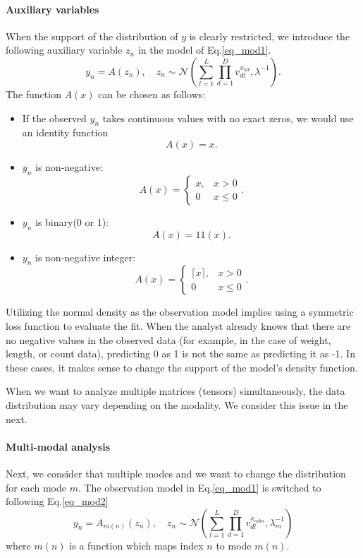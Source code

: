 \documentclass[a4paper,12ptc]{jsarticle} %
\newcommand{\one}{1\!\!1}
\begin{document}
\paragraph{Auxiliary variables}
When the support of the distribution of $y$ is clearly restricted, we introduce the following auxiliary variable $z_n$ in the model of Eq.\ref{eq_mod1}.
\begin{equation}
    y_n = A(z_n), \quad z_n \sim \mathcal{N}\left(\sum_{l=1}^L \prod_{d=1}^Dv_{dl}^{x_{nd}}, \lambda^{-1}\right).
\end{equation}
The function $A(x)$  can be chosen as follows:
\begin{itemize}
\item If the observed $y_n$ takes continuous values with no exact zeros, we would use an identity function 
$$
A(x)=x.
$$
    \item 
$y_n$ is non-negative:
$$
A(x)=\begin{cases}x, &x>0\\0 &x\leq 0\end{cases}.
$$
\item
$y_n$ is binary(0 or 1):
$$
A(x)=\one(x).
$$
\item
$y_n$ is non-negative integer:
$$
A(x)=\begin{cases}\lceil x\rceil, & x>0\\0 &x\leq 0\end{cases}.
$$
\end{itemize}
Utilizing the normal density as the observation model implies using a symmetric loss function to evaluate the fit.
When the analyst already knows that there are no negative values in the observed data (for example, in the case of weight, length, or count data), predicting 0 as 1 is not the same as predicting it as -1.
In these cases, it makes sense to change the support of the model's density function.

When we want to analyze multiple matrices (tensors) simultaneously, the data distribution may vary depending on the modality. 
We consider this issue in the next.

\paragraph{Multi-modal analysis} Next, we consider that multiple modes and we want to change the distribution for each mode $m$. The observation model in Eq.\ref{eq_mod1} is switched to following Eq.\ref{eq_mod2}  
\begin{equation}
    y_{n} = A_{m(n)}(z_{n}), \quad z_{n} \sim \mathcal{N}\left(\sum_{l=1}^L \prod_{d=1}^Dv_{dl}^{x_{ndm}}, \lambda^{-1}_m\right) \label{eq_mod2}    
\end{equation}
where $m(n)$ is a function which maps index $n$ to mode $m(n)$. 
\end{document}
